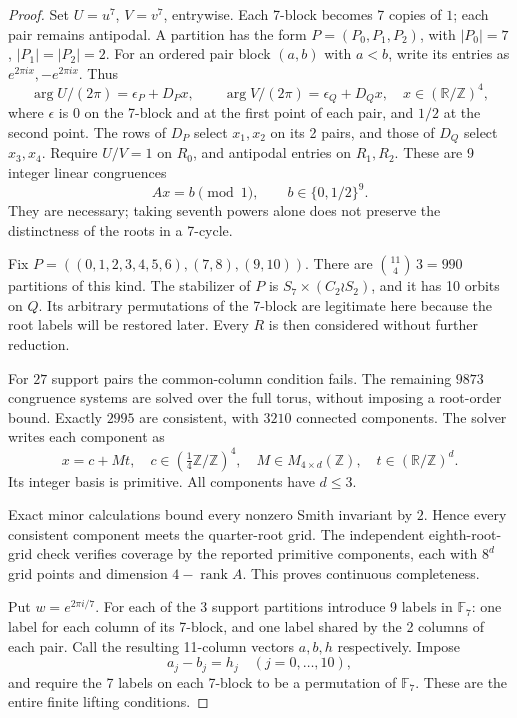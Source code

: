 \documentclass[11pt,a4paper]{article}
\theoremstyle{plain}
\theoremstyle{definition}
\theoremstyle{plain}
\begin{document}
\begin{proof}
Set $U=u^7$, $V=v^7$, entrywise. Each 7-block becomes 7 copies of $1$; each pair remains antipodal. A partition has the form $P=(P_0,P_1,P_2)$, with $|P_0|=7$, $|P_1|=|P_2|=2$. For an ordered pair block $(a,b)$ with $a<b$, write its entries as $e^{2\pi i x},-e^{2\pi i x}$. Thus
$$\arg U/(2\pi)=\epsilon_P+D_Px,\qquad \arg V/(2\pi)=\epsilon_Q+D_Qx,\quad x\in(\mathbb R/\mathbb{Z})^4,$$
where $\epsilon$ is $0$ on the 7-block and at the first point of each pair, and $1/2$ at the second point. The rows of $D_P$ select $x_1,x_2$ on its 2 pairs, and those of $D_Q$ select $x_3,x_4$. Require $U/V=1$ on $R_0$, and antipodal entries on $R_1,R_2$. These are 9 integer linear congruences
$$A x=b\pmod1,\qquad b\in\{0,1/2\}^9.$$
They are necessary; taking seventh powers alone does not preserve the distinctness of the roots in a 7-cycle.

Fix $P=((0,1,2,3,4,5,6),(7,8),(9,10))$. There are $\binom{11}{4}\,3=990$ partitions of this kind. The stabilizer of $P$ is $S_7\times(C_2\wr S_2)$, and it has 10 orbits on $Q$. Its arbitrary permutations of the 7-block are legitimate here because the root labels will be restored later. Every $R$ is then considered without further reduction.

For $27$ support pairs the common-column condition fails. The remaining $9873$ congruence systems are solved over the full torus, without imposing a root-order bound. Exactly $2995$ are consistent, with $3210$ connected components. The solver writes each component as
$$x=c+Mt,\quad c\in(\tfrac14\mathbb{Z}/\mathbb{Z})^4,\quad M\in M_{4\times d}(\mathbb{Z}),\quad t\in(\mathbb R/\mathbb{Z})^d.$$
Its integer basis is primitive. All components have $d\le3$.

Exact minor calculations bound every nonzero Smith invariant by $2$. Hence every consistent component meets the quarter-root grid. The independent eighth-root-grid check verifies coverage by the reported primitive components, each with $8^d$ grid points and dimension $4-\operatorname{rank}A$. This proves continuous completeness.

Put $w=e^{2\pi i/7}$. For each of the 3 support partitions introduce 9 labels in $\mathbb{F}_7$: one label for each column of its 7-block, and one label shared by the 2 columns of each pair. Call the resulting 11-column vectors $a,b,h$ respectively. Impose
$$a_j-b_j=h_j\quad(j=0,\ldots,10),$$
and require the 7 labels on each 7-block to be a permutation of $\mathbb{F}_7$. These are the entire finite lifting conditions.


\end{proof}
\end{document}
